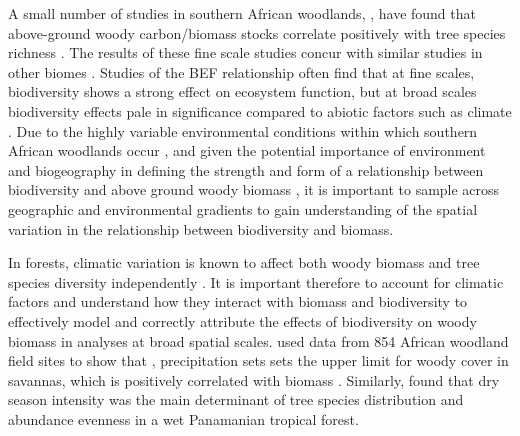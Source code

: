 \documentclass[11pt,a4paper]{article}
\newcommand{\textapprox}{\raisebox{0.5ex}{\texttildelow}}  %
\begin{document}
A small number of studies in southern African woodlands, , have found that above-ground woody carbon/biomass stocks correlate positively with tree species richness \citep{McNicol2018, Shirima2015, Mutowo2012}. The results of these fine scale studies concur with similar studies in other biomes \citep{}. Studies of the BEF relationship often find that at fine scales, biodiversity shows a strong effect on ecosystem function, but at broad scales biodiversity effects pale in significance compared to abiotic factors such as climate \citep{Pasari2013}. Due to the highly variable environmental conditions within which southern African woodlands occur \citep{Frost1996},  and given the potential importance of environment and biogeography in defining the strength and form of a relationship between biodiversity and above ground woody biomass \citep{}, it is important to sample across geographic and environmental gradients to gain understanding of the spatial variation in the relationship between biodiversity and biomass. 




In forests, climatic variation is known to affect both woody biomass \citep{Michaletz2014, Michaletz2018} and tree species diversity independently \citep{Spasojevic2014}. It is important therefore to account for climatic factors and understand how they interact with biomass and biodiversity to effectively model and correctly attribute the effects of biodiversity on woody biomass in analyses at broad spatial scales. \citet{Sankaran2005} used data from 854 African woodland field sites to show that \rnew{below a threshold of \textapprox{}650 mm MAP}, precipitation sets sets the upper limit for woody cover in savannas, which is positively correlated with biomass \citep{Chisholm2013, Prado-Junior2016}. Similarly, \citet{Condit2013} found that dry season intensity was the main determinant of tree species distribution and abundance evenness in a wet Panamanian tropical forest.
\end{document}
